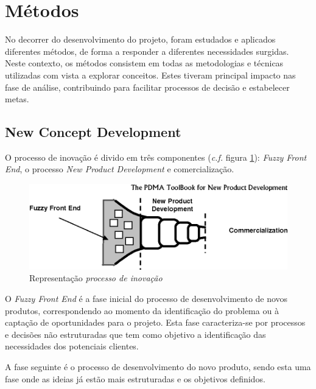 \section{Métodos\label{section_metodos}}
No decorrer do desenvolvimento do projeto, foram estudados e aplicados diferentes métodos, de forma a responder a diferentes necessidades surgidas. Neste contexto, os métodos consistem em todas as metodologias e técnicas utilizadas com vista a explorar conceitos. Estes tiveram principal impacto nas fase de análise, contribuindo para facilitar processos de decisão e estabelecer metas.

\subsection{New Concept Development \label{subsection_new_concept_development}}
O processo de inovação é divido em três componentes (\emph{c.f.} figura \ref{figura_processo_inovacao}): \emph{Fuzzy
Front End}, o processo \emph{New Product Development} e comercialização\cite{fuzzy_frontend}.

\begin{figure}[H]
    \begin{center}
    \includegraphics[width=1\textwidth]{figures/new_product_development.png}
    \caption{Representação \emph{processo de inovação}}
    \label{figura_processo_inovacao}
    \end{center}
\end{figure}

O \emph{Fuzzy Front End} é a fase inicial do processo de desenvolvimento de novos produtos, correspondendo ao momento da identificação do problema ou à captação de oportunidades para o
projeto. Esta fase caracteriza-se por processos e decisões não estruturadas que tem como objetivo a identificação das necessidades dos potenciais clientes. 

A fase seguinte é o processo de  desenvolvimento do novo produto, sendo esta uma fase onde as ideias já estão mais estruturadas e os objetivos definidos. 

